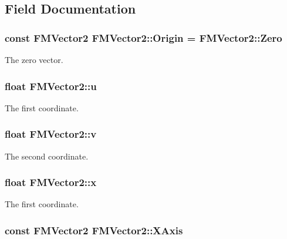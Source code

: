 \subsection{Field Documentation}
\hypertarget{classFMVector2_ac92a195612c79d7228214b8ad17d3c83}{
\subsubsection[{Origin}]{\setlength{\rightskip}{0pt plus 5cm}const {\bf FMVector2} {\bf FMVector2::Origin} = {\bf FMVector2::Zero}}}
\label{classFMVector2_ac92a195612c79d7228214b8ad17d3c83}
The zero vector. \hypertarget{classFMVector2_ae9271c21509c9a23fdeaacb30e3ec49f}{
\subsubsection[{u}]{\setlength{\rightskip}{0pt plus 5cm}float {\bf FMVector2::u}}}
\label{classFMVector2_ae9271c21509c9a23fdeaacb30e3ec49f}
The first coordinate. \hypertarget{classFMVector2_ad336a3412e6070c3419df8a82ccdfeac}{
\subsubsection[{v}]{\setlength{\rightskip}{0pt plus 5cm}float {\bf FMVector2::v}}}
\label{classFMVector2_ad336a3412e6070c3419df8a82ccdfeac}
The second coordinate. \hypertarget{classFMVector2_add13f67c553344452ad5274297afeebf}{
\subsubsection[{x}]{\setlength{\rightskip}{0pt plus 5cm}float {\bf FMVector2::x}}}
\label{classFMVector2_add13f67c553344452ad5274297afeebf}
The first coordinate. \hypertarget{classFMVector2_af1e472e6de273133987bb212befb2615}{
\subsubsection[{XAxis}]{\setlength{\rightskip}{0pt plus 5cm}const {\bf FMVector2} {\bf FMVector2::XAxis}}}
